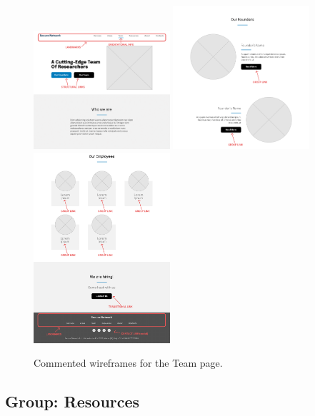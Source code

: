\documentclass[12pt]{report}
\begin{document}
\begin{figure}[H]
	\centering
	\includegraphics[width=0.45\textwidth]{low_fid_wireframes/team/1.png}
	\includegraphics[width=0.45\textwidth]{low_fid_wireframes/team/2.png}
	\includegraphics[width=0.45\textwidth]{low_fid_wireframes/team/3.png}
	\caption{Commented wireframes for the Team page.}
\end{figure}

\subsection{Group: Resources}
\end{document}
